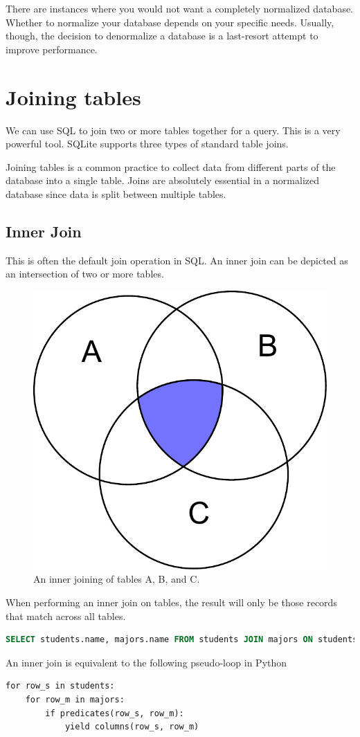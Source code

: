 \begin{info}
There are instances where you would not want a completely normalized database.
Whether to normalize your database depends on your specific needs.
Usually, though, the decision to denormalize a database is a last-resort attempt to improve performance.
\end{info}

\section*{Joining tables}
We can use SQL to join two or more tables together for a query.
This is a very powerful tool.
SQLite supports three types of standard table joins.

Joining tables is a common practice to collect data from different parts of the database into a single table.
Joins are absolutely essential in a normalized database since data is split between multiple tables.

\subsection*{Inner Join}
This is often the default join operation in SQL.
An inner join can be depicted as an intersection of two or more tables.
\begin{figure}
\centering
\includegraphics[width=.5\textwidth]{inner_join.pdf}
\caption{An inner joining of tables A, B, and C.}
\label{fig:inner_join}
\end{figure}
When performing an inner join on tables, the result will only be those records that match across all tables.
\begin{lstlisting}[language=SQL]
SELECT students.name, majors.name FROM students JOIN majors ON students.majorcode=majors.id;
\end{lstlisting}
An inner join is equivalent to the following pseudo-loop in Python
\begin{lstlisting}
for row_s in students:
    for row_m in majors:
        if predicates(row_s, row_m):
            yield columns(row_s, row_m)
\end{lstlisting}

